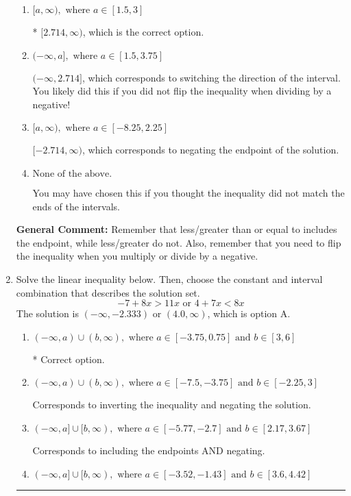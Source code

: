 \documentclass{extbook}[14pt]
\newcommand{\litem}[1]{\item #1

\rule{\textwidth}{0.4pt}}
\begin{document}
\begin{enumerate}
{\begin{enumerate}[label=\Alph*.]
 $(-\infty, -2.714]$, which corresponds to switching the direction of the interval AND negating the endpoint. You likely did this if you did not flip the inequality when dividing by a negative as well as not moving values over to a side properly.
\item \( [a, \infty), \text{ where } a \in [1.5, 3] \)

* $[2.714, \infty)$, which is the correct option.
\item \( (-\infty, a], \text{ where } a \in [1.5, 3.75] \)

 $(-\infty, 2.714]$, which corresponds to switching the direction of the interval. You likely did this if you did not flip the inequality when dividing by a negative!
\item \( [a, \infty), \text{ where } a \in [-8.25, 2.25] \)

 $[-2.714, \infty)$, which corresponds to negating the endpoint of the solution.
\item \( \text{None of the above}. \)

You may have chosen this if you thought the inequality did not match the ends of the intervals.
\end{enumerate}

\textbf{General Comment:} Remember that less/greater than or equal to includes the endpoint, while less/greater do not. Also, remember that you need to flip the inequality when you multiply or divide by a negative.
}
\litem{
Solve the linear inequality below. Then, choose the constant and interval combination that describes the solution set.
\[ -7 + 8 x > 11 x \text{ or } 4 + 7 x < 8 x \]The solution is \( (-\infty, -2.333) \text{ or } (4.0, \infty) \), which is option A.\begin{enumerate}[label=\Alph*.]
\item \( (-\infty, a) \cup (b, \infty), \text{ where } a \in [-3.75, 0.75] \text{ and } b \in [3, 6] \)

 * Correct option.
\item \( (-\infty, a) \cup (b, \infty), \text{ where } a \in [-7.5, -3.75] \text{ and } b \in [-2.25, 3] \)

Corresponds to inverting the inequality and negating the solution.
\item \( (-\infty, a] \cup [b, \infty), \text{ where } a \in [-5.77, -2.7] \text{ and } b \in [2.17, 3.67] \)

Corresponds to including the endpoints AND negating.
\item \( (-\infty, a] \cup [b, \infty), \text{ where } a \in [-3.52, -1.43] \text{ and } b \in [3.6, 4.42] \)


\end{enumerate}}
\end{enumerate}
\end{document}

